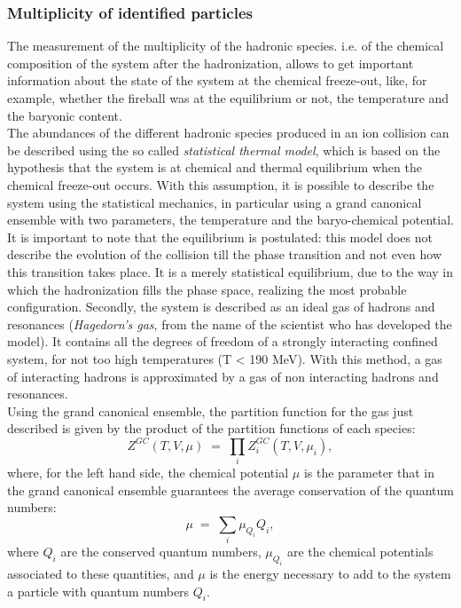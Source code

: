 \subsubsection{Multiplicity of identified particles}
The measurement of the multiplicity of the hadronic species. i.e. of the chemical composition of the system after the hadronization, allows to get important information about the state of the system at the chemical freeze-out, like, for example, whether the fireball was at the equilibrium or not, the temperature and the baryonic content.\\
The abundances of the different hadronic species produced in an ion collision can be described using the so called \textit{statistical thermal model}, which is based on the hypothesis that the system is at chemical and thermal equilibrium when the chemical freeze-out occurs. With this assumption, it is possible to describe the system using the statistical mechanics, in particular using a grand canonical ensemble with two parameters, the temperature and the baryo-chemical potential. It is important to note that the equilibrium is postulated: this model does not describe the evolution of the collision till the phase transition and not even how this transition takes place. It is a merely statistical equilibrium, due to the way in which the hadronization fills the phase space, realizing the most probable configuration. Secondly, the system is described as an ideal gas of hadrons and resonances (\textit{Hagedorn's gas}, from the name of the scientist who has developed the model). It contains all the degrees of freedom of a strongly interacting confined system, for not too high temperatures (T < 190 MeV). With this method, a gas of interacting hadrons is approximated by a gas of non interacting hadrons and resonances.\\
Using the grand canonical ensemble, the partition function for the gas just described is given by the product of the partition functions of each species:
\begin{equation}
 Z^{GC}(T,V,\mu)\; = \;\prod_{i}Z^{GC}_{i}(T,V,\mu_{i}),
\end{equation}
where, for the left hand side, the chemical potential $\mu$ is the parameter that in the grand canonical ensemble guarantees the average conservation of the quantum numbers:
\begin{equation}
\mu \; = \;\sum_{i} \mu_{Q_{i}}Q_{i},
\end{equation}
where $Q_{i}$ are the conserved quantum numbers, $\mu_{Q_{i}}$ are the chemical potentials associated to these quantities, and $\mu$ is the energy necessary to add to the system a particle with quantum numbers $Q_{i}$.\\

